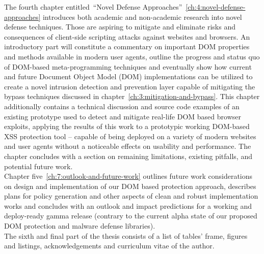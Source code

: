  The fourth chapter entitled~``Novel Defense Approaches''~\ref{ch:4:novel-defense-approaches} introduces both academic and non-academic research into novel defense techniques. Those are aspiring to mitigate and eliminate risks and consequences of client-side scripting attacks against websites and browsers. An introductory part will constitute a commentary on important DOM properties and methods available in modern user agents, outline the progress and status quo of DOM-based meta-programming techniques and eventually show how current and future Document Object Model (DOM) implementations can be utilized to create a novel intrusion detection and prevention layer capable of mitigating the bypass techniques discussed in chapter~\ref{ch:3:mitigation-and-bypass}. This chapter additionally contains a technical discussion and source code examples of an existing prototype used to detect and mitigate real-life DOM based browser exploits, applying the results of this work to a prototypic working DOM-based XSS protection tool -- capable of being deployed on a variety of modern websites and user agents without a noticeable effects on usability and performance. The chapter concludes with a section on remaining limitations, existing pitfalls, and potential future work.\\

  Chapter five~\ref{ch:7:outlook-and-future-work} outlines future work considerations on design and implementation of our DOM based protection approach, describes plans for policy generation and other aspects of clean and robust implementation works and concludes with an outlook and impact predictions for a working and deploy-ready gamma release (contrary to the current alpha state of our proposed DOM protection and malware defense libraries). \\

  The sixth and final part of the thesis consists of a list of tables' frame, figures and listings, acknowledgements and curriculum vitae of the author.\\

  